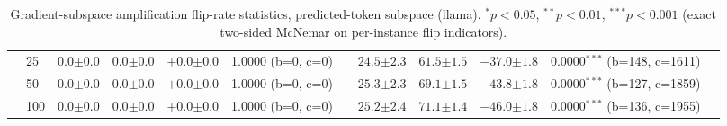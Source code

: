 \begin{table}[h!]
\begin{tabular}{l l | cccc c | cccc c}
 & 25 & $0.0 {\scriptstyle \pm 0.0}$ & $0.0 {\scriptstyle \pm 0.0}$ & $+0.0 {\scriptstyle \pm 0.0}$ & 1.0000 (b=0, c=0) &  & $24.5 {\scriptstyle \pm 2.3}$ & $61.5 {\scriptstyle \pm 1.5}$ & $-37.0 {\scriptstyle \pm 1.8}$ & 0.0000$^{***}$ (b=148, c=1611) &  \\
 & 50 & $0.0 {\scriptstyle \pm 0.0}$ & $0.0 {\scriptstyle \pm 0.0}$ & $+0.0 {\scriptstyle \pm 0.0}$ & 1.0000 (b=0, c=0) &  & $25.3 {\scriptstyle \pm 2.3}$ & $69.1 {\scriptstyle \pm 1.5}$ & $-43.8 {\scriptstyle \pm 1.8}$ & 0.0000$^{***}$ (b=127, c=1859) &  \\
 & 100 & $0.0 {\scriptstyle \pm 0.0}$ & $0.0 {\scriptstyle \pm 0.0}$ & $+0.0 {\scriptstyle \pm 0.0}$ & 1.0000 (b=0, c=0) &  & $25.2 {\scriptstyle \pm 2.4}$ & $71.1 {\scriptstyle \pm 1.4}$ & $-46.0 {\scriptstyle \pm 1.8}$ & 0.0000$^{***}$ (b=136, c=1955) &  \\
\bottomrule
\end{tabular}
\caption{Gradient-subspace amplification flip-rate statistics, predicted-token subspace (llama). $^{*}p{<}0.05$, $^{**}p{<}0.01$, $^{***}p{<}0.001$ (exact two-sided McNemar on per-instance flip indicators).}
\label{tab:gradsubspace_predtoken_amp_stats_llama}
\end{table}